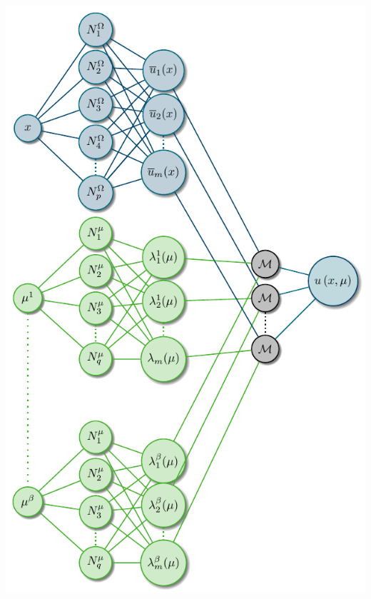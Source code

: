 \documentclass[aspectratio=1610, 10pt]{beamer}
\begin{document}
\begin{frame}
\begin{minipage}{0.58\linewidth}
        \end{minipage}
        \hfill 
        \begin{minipage}{0.38\linewidth}
            \centering
    
            \includegraphics[width=\linewidth]{Schema/HiDeNN-TD-SpatialParam.pdf}
        \end{minipage}
    \end{frame}
\end{document}
